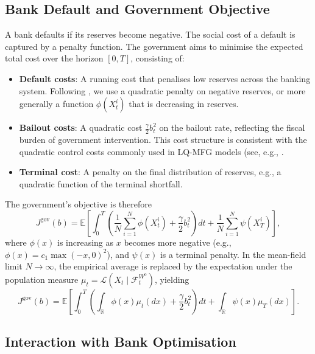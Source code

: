 \subsection{Bank Default and Government Objective}

A bank defaults if its reserves become negative. The social cost of a default is
captured by a penalty function. The government aims to minimise the expected total
cost over the horizon $[0,T]$, consisting of:

\begin{itemize}
    \item \textbf{Default costs}: A running cost that penalises low reserves across
    the banking system. Following \citep{carmonafouquesun2015}, we use a
    quadratic penalty on negative reserves, or more generally a function
    $\phi(X_t^i)$ that is decreasing in reserves.
    \item \textbf{Bailout costs}: A quadratic cost $\tfrac{\gamma}{2} b_t^2$ on the
    bailout rate, reflecting the fiscal burden of government intervention. This cost
    structure is consistent with the quadratic control costs commonly used in
    LQ-MFG models (see, e.g., \citep{cuchieroreisingerrigger2024}.
    \item \textbf{Terminal cost}: A penalty on the final distribution of reserves,
    e.g., a quadratic function of the terminal shortfall.
\end{itemize}

The government's objective is therefore
\begin{equation}
    J^{\mathrm{gov}}(b) = \mathbb{E}\left[ \int_0^T \left( \frac{1}{N}\sum_{i=1}^N
    \phi(X_t^i) + \frac{\gamma}{2} b_t^2 \right) dt + \frac{1}{N}\sum_{i=1}^N
    \psi(X_T^i) \right],
    \label{eq:sr-gov-objective-finite}
\end{equation}
where $\phi(x)$ is increasing as $x$ becomes more negative (e.g.,
$\phi(x) = c_1 \max(-x,0)^2$), and $\psi(x)$ is a terminal penalty. In the mean-field
limit $N \to \infty$, the empirical average is replaced by the expectation under the
population measure $\mu_t = \mathcal{L}(X_t \mid \mathcal{F}_t^{W^0})$, yielding
\begin{equation}
    J^{\mathrm{gov}}(b) = \mathbb{E}\left[ \int_0^T \left( \int_{\mathbb{R}}
    \phi(x)\mu_t(dx) + \frac{\gamma}{2} b_t^2 \right) dt + \int_{\mathbb{R}} \psi(x)
    \mu_T(dx) \right].
    \label{eq:sr-gov-objective-mf}
\end{equation}

\subsection{Interaction with Bank Optimisation}

